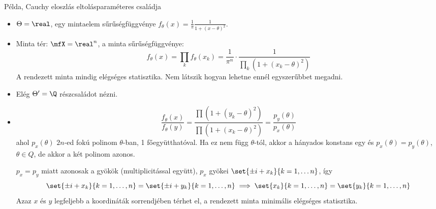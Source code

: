 \documentclass[aspectratio=169,notheorems,9pt,\option]{beamer}
\begin{document}
\begin{frame}{Példa, Cauchy eloszlás eltolásparaméteres családja}
  \begin{itemize}
    \item $\Theta=\real$, egy mintaelem sűrűségfüggvénye 
    $f_{\theta}(x)=\frac1\pi\frac{1}{1+(x-\theta)^2}$.
    \item Minta tér: $\mfX=\real^n$, a minta sűrűségfüggvénye:
    \begin{displaymath}
      f_\theta(x)=\prod_k f_\theta(x_k)
      =\frac1{\pi^n}\cdot\frac1{\prod_k(1+(x_k-\theta)^2)}
    \end{displaymath}
    A rendezett minta mindig elégséges statisztika. 
    Nem látszik hogyan lehetne ennél egyszerűbbet megadni.
    \item Elég $\Theta'=\Q$ részcsaládot nézni.
    \item 
    \begin{displaymath}
      \frac{f_\theta(x)}{f_\theta(y)}
      =\frac{\prod(1+(y_k-\theta)^2)}{\prod(1+(x_k-\theta)^2)} =\frac{p_y(\theta)}{p_x(\theta)}
    \end{displaymath}
    ahol $p_x(\theta)$ $2n$-ed fokú polinom $\theta$-ban, 1 főegyütthatóval. 
    Ha ez nem függ $\theta$-tól, akkor a hányados konstans egy 
    és $p_x(\theta)=p_y(\theta)$, $\theta\in Q$, de akkor a két polinom azonos.

    $p_x=p_y$ miatt azonosak a gyökök (multiplicitással együtt), 
    $p_x$ gyökei $\set{\pm i+x_k}{k=1,\dots n}$, így 
    \begin{displaymath}
      \set{\pm i+x_k}{k=1,\dots,n}=\set{\pm i+ y_k}{k=1,\dots,n}
      \implies\set{x_k}{k=1,\dots,n}=\set{y_k}{k=1,\dots,n}
    \end{displaymath}
    Azaz $x$ és $y$ legfeljebb a koordináták sorrendjében 
    térhet el, a rendezett minta minimális elégséges statisztika.
  \end{itemize}
\end{frame}
\end{document}
